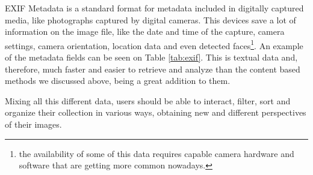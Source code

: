 EXIF Metadata is a standard format for metadata included in digitally captured media, like photographs captured by digital cameras. This devices save a lot of information on the image file, like the date and time of the capture, camera settings, camera orientation, location data and even detected faces\footnote{the availability of some of this data requires capable camera hardware and software that are getting more common nowadays.}. An example of the metadata fields can be seen on Table \ref{tab:exif}. This is textual data and, therefore, much faster and easier to retrieve and analyze than the content based methods we discussed above, being a great addition to them.

Mixing all this different data, users should be able to interact, filter, sort and organize their collection in various ways, obtaining new and different perspectives of their images.

